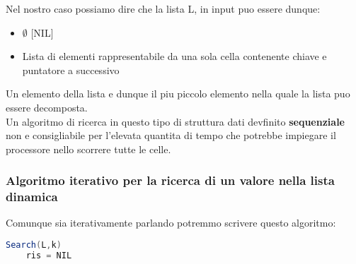 


Nel nostro caso possiamo dire che la lista L, in input puo essere dunque:
\begin{itemize}
\item $\emptyset$ [NIL]
\item Lista di elementi rappresentabile da una sola cella contenente chiave e puntatore a successivo 
\end{itemize}

Un elemento della lista e dunque il piu piccolo elemento nella quale la lista puo essere decomposta.
\\
Un algoritmo di ricerca in questo tipo di struttura dati devfinito \textbf{sequenziale} non e consigliabile per l'elevata quantita di tempo che potrebbe impiegare il processore nello scorrere tutte le celle.

\subsubsection{Algoritmo iterativo per la ricerca di un valore nella lista dinamica}

Comunque sia iterativamente parlando potremmo scrivere questo algoritmo:

\begin{lstlisting}[language=Java]
Search(L,k)
	ris = NIL
	
\end{lstlisting}